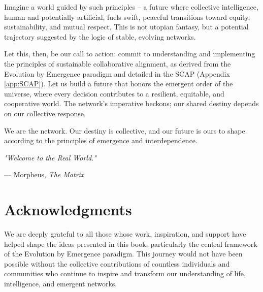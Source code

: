 \documentclass[12pt,openany]{book}
\let\cleardoublepage\clearpage %
\begin{document}
Imagine a world guided by such principles – a future where collective intelligence, human and potentially artificial, fuels swift, peaceful transitions toward equity, sustainability, and mutual respect. This is not utopian fantasy, but a potential trajectory suggested by the logic of stable, evolving networks.

Let this, then, be our call to action: commit to understanding and implementing the principles of sustainable collaborative alignment, as derived from the Evolution by Emergence paradigm and detailed in the SCAP (Appendix \ref{app:SCAP}). Let us build a future that honors the emergent order of the universe, where every decision contributes to a resilient, equitable, and cooperative world. The network's imperative beckons; our shared destiny depends on our collective response.

We are the network. Our destiny is collective, and our future is ours to shape according to the principles of emergence and interdependence.



\cleardoublepage

\thispagestyle{empty}
\epigraph{
    \textit{"Welcome to the Real World."}
}{
    --- Morpheus, \textit{The Matrix}
}
\cleardoublepage

\backmatter %

\chapter*{Acknowledgments}

We are deeply grateful to all those whose work, inspiration, and support have helped shape the ideas presented in this book, particularly the central framework of the Evolution by Emergence paradigm. This journey would not have been possible without the collective contributions of countless individuals and communities who continue to inspire and transform our understanding of life, intelligence, and emergent networks. %

\end{document}
